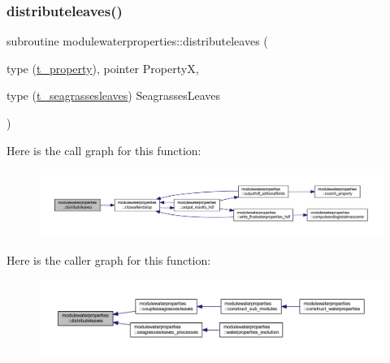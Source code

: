 \subsubsection{\texorpdfstring{distributeleaves()}{distributeleaves()}}
{\footnotesize\ttfamily subroutine modulewaterproperties\+::distributeleaves (\begin{DoxyParamCaption}\item[{type (\mbox{\hyperlink{structmodulewaterproperties_1_1t__property}{t\+\_\+property}}), pointer}]{PropertyX,  }\item[{type (\mbox{\hyperlink{structmodulewaterproperties_1_1t__seagrassesleaves}{t\+\_\+seagrassesleaves}})}]{Seagrasses\+Leaves }\end{DoxyParamCaption})\hspace{0.3cm}{\ttfamily [private]}}

Here is the call graph for this function\+:\nopagebreak
\begin{figure}[H]
\begin{center}
\leavevmode
\includegraphics[width=350pt]{namespacemodulewaterproperties_a60f5e5b09c032f11f1b1a75f101398a0_cgraph}
\end{center}
\end{figure}
Here is the caller graph for this function\+:\nopagebreak
\begin{figure}[H]
\begin{center}
\leavevmode
\includegraphics[width=350pt]{namespacemodulewaterproperties_a60f5e5b09c032f11f1b1a75f101398a0_icgraph}
\end{center}
\end{figure}
\mbox{\label{namespacemodulewaterproperties_a45571c439a7d4a05be3b427eb5ff0b9a}} 
